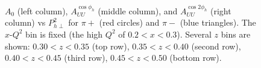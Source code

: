 \begin{figure}[htp]
\centering
\vspace{-1.5cm}
\caption{$A_0$ (left column), $A_{UU}^{\cos\phi_h}$ (middle column), and $A_{UU}^{\cos 2\phi_h}$ (right column) vs $P_{h\perp}^2$ for $\pi+$ (red circles) and $\pi-$ (blue triangles). The $x$-$Q^2$ bin is fixed (the high $Q^2$ of $0.2 < x < 0.3$). Several $z$ bins are shown: $0.30 < z < 0.35$ (top row), $0.35 < z < 0.40$ (second row), $0.40 < z < 0.45$ (third row), $0.45 < z < 0.50$ (bottom row).}
\label{fig:A0AcAcc_zPT2bins_x1QQ1_final}
\end{figure}
